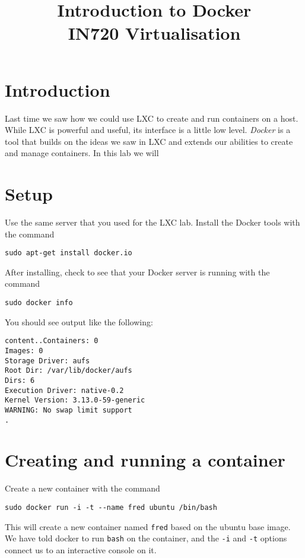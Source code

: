 \documentclass{article}
\begin{document}
\title{Introduction to Docker\\ IN720 Virtualisation}
\date{}
\maketitle

\section*{Introduction}
Last time we saw how we could use LXC to create and run containers on a host. While LXC is powerful and useful, its interface is a little low level. \emph{Docker} is a tool that builds on the ideas we saw in LXC and extends our abilities to create and manage containers.  In this lab we will 

\section{Setup}
Use the same server that you used for the LXC lab.  Install the Docker tools with the command

\texttt{sudo apt-get install docker.io}

After installing, check to see that your Docker server is running with the command 

\texttt{sudo docker info}

You should see output like the following:

\begin{verbatim}
content..Containers: 0
Images: 0
Storage Driver: aufs
Root Dir: /var/lib/docker/aufs
Dirs: 6
Execution Driver: native-0.2
Kernel Version: 3.13.0-59-generic
WARNING: No swap limit support
.
\end{verbatim}

\section{Creating and running a container}

Create a new container with the command

\begin{verbatim}
sudo docker run -i -t --name fred ubuntu /bin/bash
\end{verbatim}

This will create a new container named \texttt{fred} based on the ubuntu base image. We have told docker to run \texttt{bash} on the container, and the \texttt{-i} and \texttt{-t} options connect us to an interactive console on it.  
\end{document}
